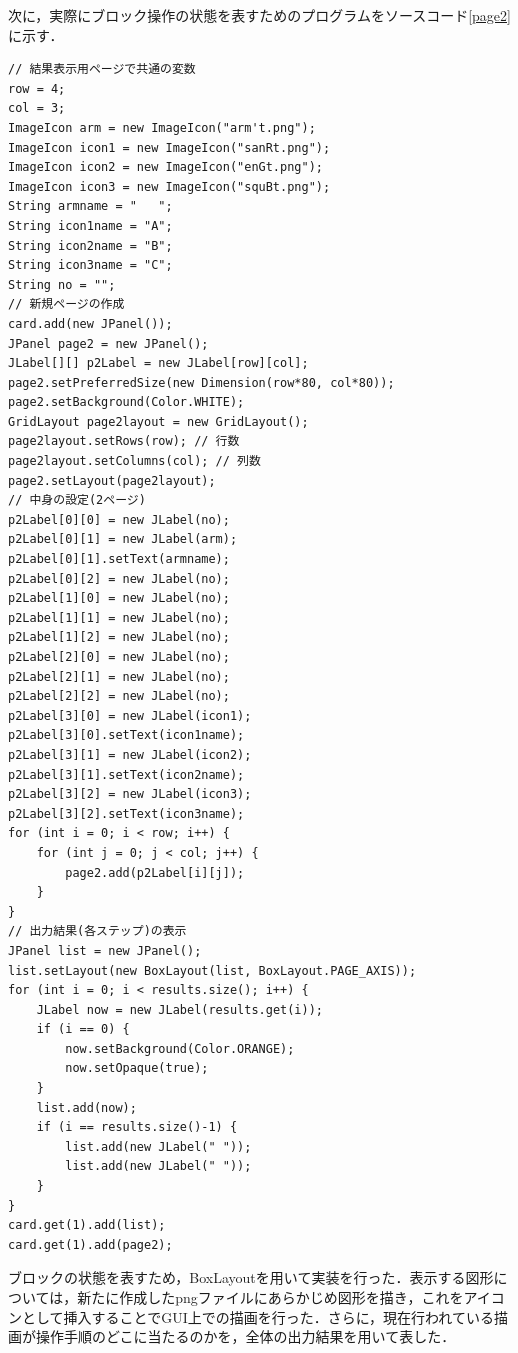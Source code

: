 \documentclass[12pt]{jarticle}
\begin{document}
次に，実際にブロック操作の状態を表すためのプログラムをソースコード\ref{page2}に示す．
\begin{lstlisting}[caption=ブロックの状態を表すプログラム,label=page2]
// 結果表示用ページで共通の変数
row = 4;
col = 3;
ImageIcon arm = new ImageIcon("arm't.png");
ImageIcon icon1 = new ImageIcon("sanRt.png");
ImageIcon icon2 = new ImageIcon("enGt.png");
ImageIcon icon3 = new ImageIcon("squBt.png");
String armname = "   ";
String icon1name = "A";
String icon2name = "B";
String icon3name = "C";
String no = "";
// 新規ページの作成
card.add(new JPanel());
JPanel page2 = new JPanel();
JLabel[][] p2Label = new JLabel[row][col];
page2.setPreferredSize(new Dimension(row*80, col*80));
page2.setBackground(Color.WHITE);
GridLayout page2layout = new GridLayout();
page2layout.setRows(row); // 行数
page2layout.setColumns(col); // 列数
page2.setLayout(page2layout);
// 中身の設定(2ページ)
p2Label[0][0] = new JLabel(no);
p2Label[0][1] = new JLabel(arm);
p2Label[0][1].setText(armname);
p2Label[0][2] = new JLabel(no);
p2Label[1][0] = new JLabel(no);
p2Label[1][1] = new JLabel(no);
p2Label[1][2] = new JLabel(no);
p2Label[2][0] = new JLabel(no);
p2Label[2][1] = new JLabel(no);
p2Label[2][2] = new JLabel(no);
p2Label[3][0] = new JLabel(icon1);
p2Label[3][0].setText(icon1name);
p2Label[3][1] = new JLabel(icon2);
p2Label[3][1].setText(icon2name);
p2Label[3][2] = new JLabel(icon3);
p2Label[3][2].setText(icon3name);
for (int i = 0; i < row; i++) {
	for (int j = 0; j < col; j++) {
		page2.add(p2Label[i][j]);
	}
}
// 出力結果(各ステップ)の表示
JPanel list = new JPanel();
list.setLayout(new BoxLayout(list, BoxLayout.PAGE_AXIS));
for (int i = 0; i < results.size(); i++) {
	JLabel now = new JLabel(results.get(i));
	if (i == 0) {
		now.setBackground(Color.ORANGE);
		now.setOpaque(true);
	}
	list.add(now);
	if (i == results.size()-1) {
		list.add(new JLabel(" "));
		list.add(new JLabel(" "));
	}
}
card.get(1).add(list);
card.get(1).add(page2);
\end{lstlisting}
ブロックの状態を表すため，BoxLayoutを用いて実装を行った．表示する図形については，新たに作成したpngファイルにあらかじめ図形を描き，これをアイコンとして挿入することでGUI上での描画を行った．さらに，現在行われている描画が操作手順のどこに当たるのかを，全体の出力結果を用いて表した．
\end{document}
